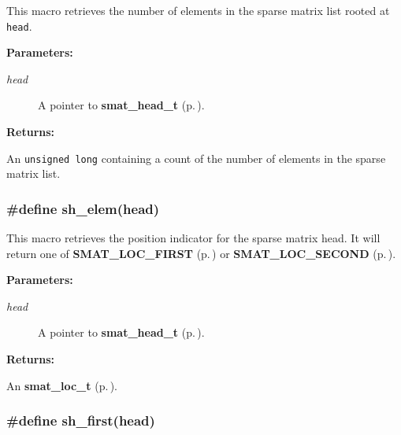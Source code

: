  This macro retrieves the number of elements in the sparse matrix list rooted at {\tt head}.\begin{Desc}
\item[{\bf Parameters: }]\par
\begin{description}
\item[
{\em head}]A pointer to {\bf smat\_\-head\_\-t} {\rm (p.\,\pageref{group__dbprim__smat_a1})}.

\end{description}
\end{Desc}
\begin{Desc}
\item[{\bf Returns: }]\par
An {\tt unsigned long} containing a count of the number of elements in the sparse matrix list. \end{Desc}
\subsubsection{\setlength{\rightskip}{0pt plus 5cm}\#define sh\_\-elem(head)}\label{group__dbprim__smat_a31}




 This macro retrieves the position indicator for the sparse matrix head. It will return one of {\bf SMAT\_\-LOC\_\-FIRST} {\rm (p.\,\pageref{group__dbprim__smat_a48a102})} or {\bf SMAT\_\-LOC\_\-SECOND} {\rm (p.\,\pageref{group__dbprim__smat_a48a103})}.\begin{Desc}
\item[{\bf Parameters: }]\par
\begin{description}
\item[
{\em head}]A pointer to {\bf smat\_\-head\_\-t} {\rm (p.\,\pageref{group__dbprim__smat_a1})}.

\end{description}
\end{Desc}
\begin{Desc}
\item[{\bf Returns: }]\par
An {\bf smat\_\-loc\_\-t} {\rm (p.\,\pageref{group__dbprim__smat_a6})}. \end{Desc}
\subsubsection{\setlength{\rightskip}{0pt plus 5cm}\#define sh\_\-first(head)}\label{group__dbprim__smat_a35}




